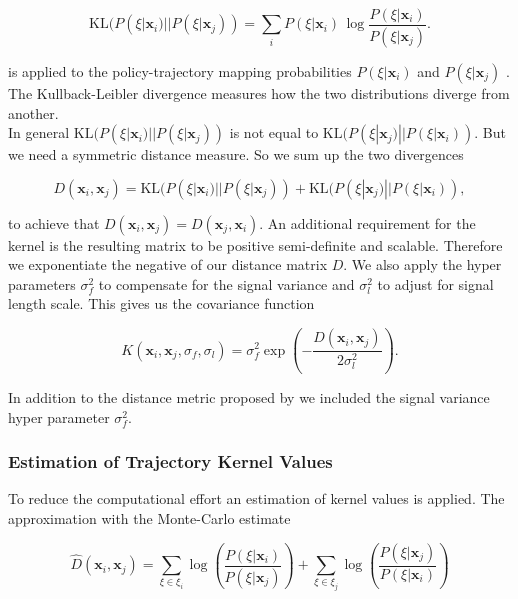 $$\mathrm {KL}(P(\xi|\mathbf{x}_{ i })||P(\xi|\mathbf{x}_{ j })) = \sum _{i}P(\xi|\mathbf{x}_{ i })\,\log {\frac {P(\xi|\mathbf{x}_{ i })}{P(\xi|\mathbf{x}_{ j })}}.$$

is applied to the policy-trajectory mapping probabilities $P(\xi|\mathbf{x}_{ i })$ and $P(\xi|\mathbf{x}_{ j })$ \cite{wilson2014using}. The Kullback-Leibler divergence measures how the two distributions diverge from another.\\

In general $\mathrm {KL}(P(\xi|\mathbf{x}_{ i })||P(\xi|\mathbf{x}_{ j }))$ is not equal to $\mathrm {KL}(P(\xi|\mathbf{x}_{ j })||P(\xi|\mathbf{x}_{ i }))$. But we need a symmetric distance measure. So we sum up the two divergences

$$D(\mathbf{x}_{ i }, \mathbf{x}_{ j }) = \mathrm {KL}(P(\xi|\mathbf{x}_{ i })||P(\xi|\mathbf{x}_{ j })) + \mathrm {KL}(P(\xi|\mathbf{x}_{ j })||P(\xi|\mathbf{x}_{ i })),$$

to achieve that $D(\mathbf{x}_{ i }, \mathbf{x}_{ j }) = D(\mathbf{x}_{ j }, \mathbf{x}_{ i })$. An additional requirement for the kernel is the resulting matrix to be positive semi-definite and scalable\cite{wilson2014using}. Therefore we exponentiate the negative of our distance matrix $D$. We also apply the hyper parameters $\sigma_f^2$ to compensate for the signal variance and $\sigma_l^2$ to adjust for signal length scale. This gives us the covariance function

\begin{equation} \label{eq:trajKernel}
K(\mathbf{x}_{ i },\mathbf{x}_{ j },\sigma_f,\sigma_l) = \sigma_f^2 \exp\left(-\frac{D(\mathbf{x}_i,\mathbf{x}_j)}{2\sigma_l^2} \right).
\end{equation}

In addition to the distance metric proposed by \cite{wilson2014using} we included the signal variance hyper parameter $\sigma_f^2$.

\subsubsection{Estimation of Trajectory Kernel Values}
To reduce the computational effort an estimation of kernel values is applied. The approximation with the Monte-Carlo estimate

\begin{equation} \label{eq:tk:mc}
    \hat{D}(\mathbf{x}_{ i }, \mathbf{x}_{ j }) = \sum _{\xi \in \xi_i} \log\left( \frac{P(\xi|\mathbf{x}_{ i })}{P(\xi|\mathbf{x}_{ j })} \right) + \sum _{\xi \in \xi_j} \log\left( \frac{P(\xi|\mathbf{x}_{ j })}{P(\xi|\mathbf{x}_{ i })} \right)
\end{equation}

